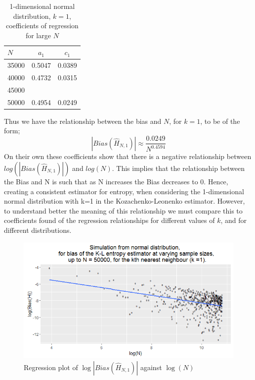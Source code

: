 \documentclass{article}
\begin{document}
\begin{table}
\caption{1-dimensional normal distribution, $k=1$, coefficients of regression for large $N$} \label{normal_k=1_reg_coeff_table}
\begin{center}
\begin{tabular}{| l | c c|}
\toprule
$N$ & $a_{1}$ & $c_{1}$ \\
\midrule[1pt]
35000 &  0.5047   &   0.0389   \\
40000 &  0.4732   &   0.0315  \\
45000 &     &      \\
50000 &  0.4954  &   0.0249   \\
\end{tabular}
\end{center}
\end{table}

Thus we have the relationship between the bias and $N$, for $k=1$, to be of the form;
\begin{equation}
|Bias(\hat{H}_{N, 1})| \approx \frac{0.0249}{N^{0.4594}} \nonumber
\end{equation}
On their own these coefficients show that there is a negative relationship between $log(|Bias(\hat{H}_{N, 1})|)$ and $log(N)$. This implies that the relationship between the Bias and N is such that as N increases the Bias decreases to 0. Hence, creating a consistent estimator for entropy, when considering the 1-dimensional normal distribution with k=1 in the Kozachenko-Leonenko estimator. However, to understand better the meaning of this relationship we must compare this to coefficients found of the regression relationships for different values of $k$, and for different distributions.

\begin{figure}
  \begin{center}
    \includegraphics[width=\textwidth]{./Graphs/Normal_k=1_plot.png}
  \end{center}
\caption{Regression plot of $\log|Bias(\hat{H}_{N, 1})|$ against $\log(N)$}
  \label{normal_k=1_graph}
\end{figure}
\end{document}
